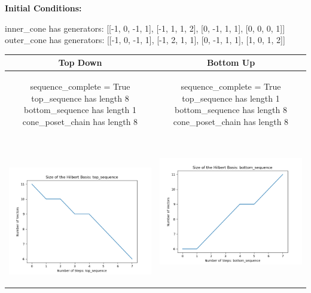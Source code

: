 \documentclass[10pt]{article}
\begin{document}
\textbf{Initial Conditions:}
\begin{SAGE}
inner_cone has generators: 
[[-1, 0, -1, 1], [-1, 1, 1, 2], [0, -1, 1, 1], [0, 0, 0, 1]]
outer_cone has generators: 
[[-1, 0, -1, 1], [-1, 2, 1, 1], [0, -1, 1, 1], [1, 0, 1, 2]]

\end{SAGE}
\begin{tabular}{c|c}
\textbf{Top Down} & \textbf{Bottom Up} \\ \hline  
\begin{SAGE}
	sequence_complete = True
	top_sequence has length 8
	bottom_sequence has length 1
	cone_poset_chain has length 8
\end{SAGE} 
&
\begin{SAGE}
	sequence_complete = True
	top_sequence has length 1
	bottom_sequence has length 8
	cone_poset_chain has length 8
\end{SAGE} 
\\ \hline
\
\begin{minipage}{.45\textwidth}
\includegraphics[width=\textwidth]{"DATA/4d/4 generators 2 bound E/top_sequence SIZE"}
\end{minipage} &
\begin{minipage}{.45\textwidth}
\includegraphics[width=\textwidth]{"DATA/4d/4 generators 2 bound E bottomup/bottom_sequence SIZE"}

\end{minipage}
\end{tabular}
\end{document}
